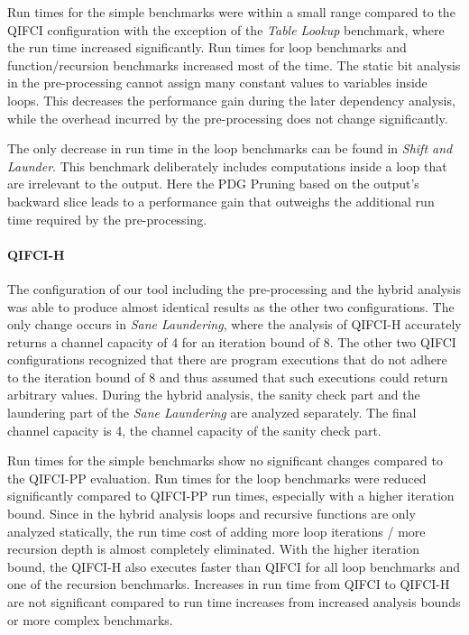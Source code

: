 Run times for the simple benchmarks were within a small range compared to the QIFCI configuration with the exception of the \emph{Table Lookup} benchmark, where the run time increased significantly. Run times for loop benchmarks and function/recursion benchmarks increased most of the time. The static bit analysis in the pre-processing cannot assign many constant values to variables inside loops. This decreases the performance gain during the later dependency analysis, while the overhead incurred by the pre-processing does not change significantly. 


The only decrease in run time in the loop benchmarks can be found in \emph{Shift and Launder}. This benchmark deliberately includes computations inside a loop that are irrelevant to the output. Here the PDG Pruning based on the output's backward slice leads to a performance gain that outweighs the additional run time required by the pre-processing.

\paragraph{QIFCI-H}
The configuration of our tool including the pre-processing and the hybrid analysis was able to produce almost identical results as the other two configurations. The only change occurs in \emph{Sane Laundering}, where the analysis of QIFCI-H accurately returns a channel capacity of 4 for an iteration bound of 8. The other two QIFCI configurations recognized that there are program executions that do not adhere to the iteration bound of 8 and thus assumed that such executions could return arbitrary values. During the hybrid analysis, the sanity check part and the laundering part of the \emph{Sane Laundering} are analyzed separately. The final channel capacity is 4, the channel capacity of the sanity check part.

Run times for the simple benchmarks show no significant changes compared to the QIFCI-PP evaluation. Run times for the loop benchmarks were reduced significantly compared to QIFCI-PP run times, especially with a higher iteration bound. Since in the hybrid analysis loops and recursive functions are only analyzed statically, the run time cost of adding more loop iterations / more recursion depth is almost completely eliminated. With the higher iteration bound, the QIFCI-H also executes faster than QIFCI for all loop benchmarks and one of the recursion benchmarks. Increases in run time from QIFCI to QIFCI-H are not significant compared to run time increases from increased analysis bounds or more complex benchmarks.

